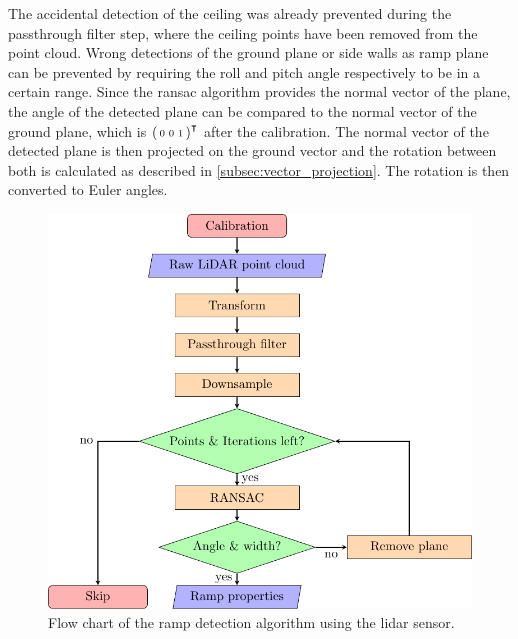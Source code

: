 The accidental detection of the ceiling was already prevented during the passthrough filter step, where the ceiling points have been removed from the point cloud.
Wrong detections of the ground plane or side walls as ramp plane can be prevented by requiring the roll and pitch angle respectively to be in a certain range.
Since the \gls{ransac} algorithm provides the normal vector of the plane, the angle of the detected plane can be compared to the normal vector of the ground plane, which is $\smqty(0 & 0 & 1)^\intercal$ after the calibration.
The normal vector of the detected plane is then projected on the ground vector and the rotation between both is calculated as described in \cref{subsec:vector_projection}.
The rotation is then converted to Euler angles.
\begin{figure}[h]
    \centering
    \includegraphics{Graphics/TikZ/flowchart_lidar.pdf}
    \caption[Flow chart of the  algorithm]{Flow chart of the ramp detection algorithm using the \acrshort{lidar} sensor.}
    \label{fig:flowchart_lidar}
\end{figure}

